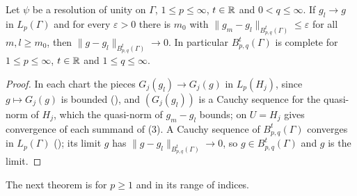 \begin{theorem}
\label{thm:boundary-besov-complete}
\leanok
{}
Let $\psi$ be a resolution of unity on $\Gamma$, $1 \leq p \leq \infty$, $t \in \mathbb{R}$ and
$0 < q \leq \infty$. If $g_l \to g$ in $L_p(\Gamma)$ and for every $\varepsilon > 0$ there is
$m_0$ with $\|g_m - g_l\|_{B^t_{p,q}(\Gamma)} \leq \varepsilon$ for all $m, l \geq m_0$, then
$\|g - g_l\|_{B^t_{p,q}(\Gamma)} \to 0$. In particular $B^t_{p,q}(\Gamma)$ is complete for
$1 \leq p \leq \infty$, $t \in \mathbb{R}$ and $1 \leq q \leq \infty$.
\end{theorem}

\begin{proof}
\leanok
In each chart the pieces $G_j(g_l) \to G_j(g)$ in $L_p(H_j)$, since $g \mapsto G_j(g)$ is bounded
(), and $(G_j(g_l))$ is a Cauchy sequence for the quasi-norm of
$H_j$, which the quasi-norm of $g_m - g_l$ bounds;  on $U = H_j$ gives
convergence of each summand of (3). A Cauchy sequence of
$B^t_{p,q}(\Gamma)$ converges in $L_p(\Gamma)$ (); its limit $g$
has $\|g - g_l\|_{B^t_{p,q}(\Gamma)} \to 0$, so $g \in B^t_{p,q}(\Gamma)$ and $g$ is the limit.
\end{proof}

The next theorem is \cite[Theorem 4.11]{SchneiderVybiral} for $p \geq 1$ and
\cite[Theorem 1.1.3(i)]{Mayboroda2005} in its range of indices.

